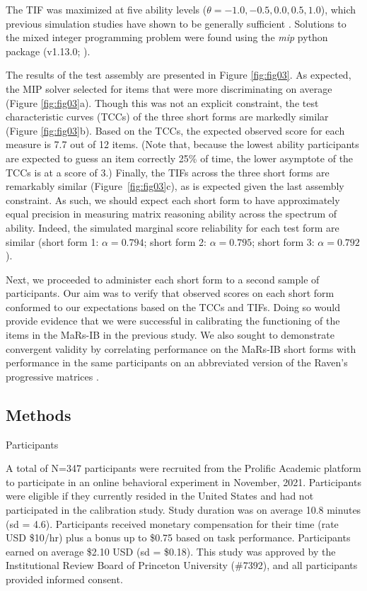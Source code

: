 \documentclass[a4paper,man,natbib]{apa6}
\makeatletter
\renewcommand{\subsubsection}{\@startsection{subsubsection}{3}
  {\z@}%
  {\b@level@two@skip}{\e@level@two@skip}%
  {\normalfont\normalsize\bfseries}}
\makeatother
\begin{document}
\noindent The TIF was maximized at five ability levels ($\theta = -1.0, -0.5, 0.0, 0.5, 1.0$), which previous simulation studies have shown to be generally sufficient \citep{der2005wj}. Solutions to the mixed integer programming problem were found using the \textit{mip} python package (v1.13.0; \citealt{santos2020mixed}).

The results of the test assembly are presented in Figure \ref{fig:fig03}. As expected, the MIP solver selected for items that were more discriminating on average (Figure \ref{fig:fig03}a). Though this was not an explicit constraint, the test characteristic curves (TCCs) of the three short forms are markedly similar (Figure \ref{fig:fig03}b). Based on the TCCs, the expected observed score for each measure is 7.7 out of 12 items. (Note that, because the lowest ability participants are expected to guess an item correctly 25\% of time, the lower asymptote of the TCCs is at a score of 3.) Finally, the TIFs across the three short forms are remarkably similar (Figure~\ref{fig:fig03}c), as is expected given the last assembly constraint. As such, we should expect each short form to have approximately equal precision in measuring matrix reasoning ability across the spectrum of ability. Indeed, the simulated marginal score reliability for each test form are similar (short form 1: $\alpha = 0.794$; short form 2: $\alpha = 0.795$; short form 3: $\alpha = 0.792$). 

Next, we proceeded to administer each short form to a second sample of participants. Our aim was to verify that observed scores on each short form conformed to our expectations based on the TCCs and TIFs. Doing so would provide evidence that we were successful in calibrating the functioning of the items in the MaRs-IB in the previous study. We also sought to demonstrate convergent validity by correlating performance on the MaRs-IB short forms with performance in the same participants on an abbreviated version of the Raven's progressive matrices \citep{bilker2012development}.

\subsection{Methods}

\subsubsection{Participants}

A total of N=347 participants were recruited from the Prolific Academic platform to participate in an online behavioral experiment in November, 2021. Participants were eligible if they currently resided in the United States and had not participated in the calibration study. Study duration was on average 10.8 minutes (sd = 4.6). Participants received monetary compensation for their time (rate USD \$10/hr) plus a bonus up to \$0.75 based on task performance. Participants earned on average \$2.10 USD (sd = \$0.18). This study was approved by the Institutional Review Board of Princeton University (\#7392), and all participants provided informed consent. 
\end{document}
